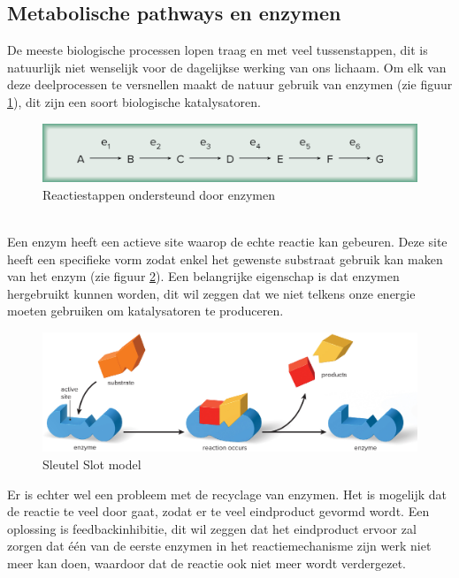 \documentclass[a4paper,kul]{kulakarticle} %
\begin{document}
\subsection{Metabolische pathways en enzymen}
\label{sec:enzymen}
De meeste biologische processen lopen traag en met veel tussenstappen, dit is natuurlijk niet wenselijk voor de dagelijkse werking van ons lichaam. Om elk van deze deelprocessen te versnellen maakt de natuur gebruik van enzymen (zie figuur \ref{fig:enzymenstappen}), dit zijn een soort biologische katalysatoren. 
\begin{figure}[h]
	\centering
	\includegraphics[width=0.7\linewidth]{EnzymenStappen}
	\caption[Enzymen]{Reactiestappen ondersteund door enzymen}
	\label{fig:enzymenstappen}
\end{figure}\\
Een enzym heeft een actieve site waarop de echte reactie kan gebeuren. Deze site heeft een specifieke vorm zodat enkel het gewenste substraat gebruik kan maken van het enzym (zie figuur \ref{fig:sleutelslot}). Een belangrijke eigenschap is dat enzymen hergebruikt kunnen worden, dit wil zeggen dat we niet telkens onze energie moeten gebruiken om katalysatoren te produceren. 
\begin{figure}[h]
	\centering
	\includegraphics[width=0.7\linewidth]{SleutelSlot}
	\caption[Sleutel Slot]{Sleutel Slot model}
	\label{fig:sleutelslot}
\end{figure}
Er is echter wel een probleem met de recyclage van enzymen. Het is mogelijk dat de reactie te veel door gaat, zodat er te veel eindproduct gevormd wordt. Een oplossing is feedbackinhibitie, dit wil zeggen dat het eindproduct ervoor zal zorgen dat één van de eerste enzymen in het reactiemechanisme zijn werk niet meer kan doen, waardoor dat de reactie ook niet meer wordt verdergezet. \\
\end{document}
